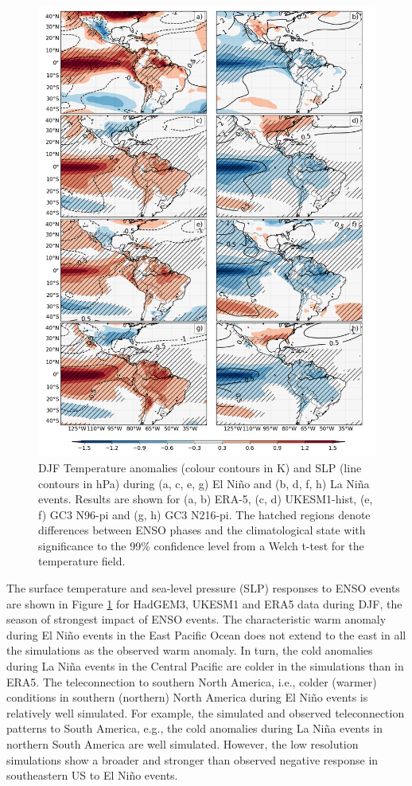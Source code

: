 \begin{figure}[t!]
\centering
 \includegraphics[width=0.89\linewidth]{figures/ensotemp_3}
\caption{ DJF Temperature anomalies (colour contours in K) and SLP (line contours in hPa) during (a, c, e, g) El Ni\~no and (b, d, f, h) La Ni\~na events. Results are shown for (a, b) ERA-5, (c, d) UKESM1-hist, (e, f) GC3 N96-pi and (g, h) GC3 N216-pi. The hatched regions denote differences between ENSO phases and the climatological state with significance to the 99\% confidence level from a Welch t-test for the temperature field. }
\label{fig:10}
\end{figure}

The surface temperature and sea-level pressure (SLP) responses to ENSO events are shown in Figure \ref{fig:10} for HadGEM3, UKESM1 and ERA5 data during DJF, the season of strongest impact of ENSO events.
The characteristic warm anomaly during El Ni\~no events in the East Pacific Ocean does not extend to the east in all the simulations as the observed warm anomaly. In turn, the cold anomalies during La Ni\~na events in the Central Pacific are colder in the simulations than in ERA5. 
The teleconnection to southern North America, i.e., colder (warmer) conditions in southern (northern) North America during El Ni\~no events is relatively well simulated. For example, the simulated and observed teleconnection patterns to South America, e.g., the cold anomalies during La Ni\~na events in northern South America are well simulated. However, the low resolution simulations show a broader and stronger than observed negative response in southeastern US to El Ni\~no events. 


